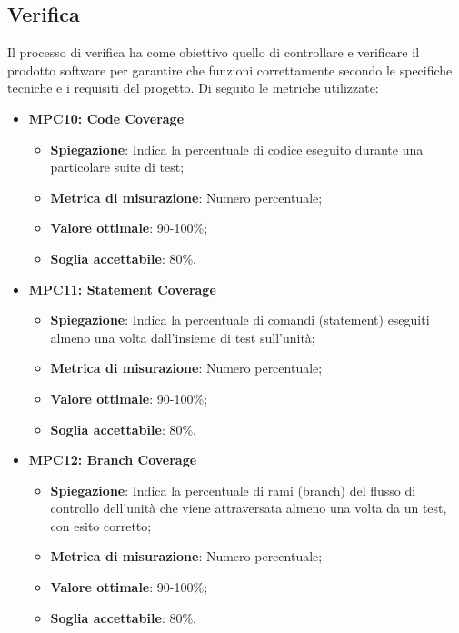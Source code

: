 \subsection{Verifica}
Il processo di verifica ha come obiettivo quello di controllare e verificare il prodotto software per garantire che funzioni correttamente secondo le specifiche tecniche e i requisiti del progetto. Di seguito le metriche utilizzate:

\begin{itemize}
    \item \textbf{MPC10: Code Coverage}
    \begin{itemize}
        \item \textbf{Spiegazione}: Indica la percentuale di codice eseguito durante una particolare suite di test;
        \item \textbf{Metrica di misurazione}: Numero percentuale;
        \item \textbf{Valore ottimale}: 90-100\%;
        \item \textbf{Soglia accettabile}: 80\%.
    \end{itemize}

    \item \textbf{MPC11: Statement Coverage}
    \begin{itemize}
        \item \textbf{Spiegazione}: Indica la percentuale di comandi (statement) eseguiti almeno una volta dall'insieme di test sull'unità;
        \item \textbf{Metrica di misurazione}: Numero percentuale;
        \item \textbf{Valore ottimale}: 90-100\%;
        \item \textbf{Soglia accettabile}: 80\%.
    \end{itemize}

    \item \textbf{MPC12: Branch Coverage}
    \begin{itemize}
        \item \textbf{Spiegazione}: Indica la percentuale di rami (branch) del flusso di controllo dell'unità che viene attraversata almeno una volta da un test, con esito corretto;
        \item \textbf{Metrica di misurazione}: Numero percentuale;
        \item \textbf{Valore ottimale}: 90-100\%;
        \item \textbf{Soglia accettabile}: 80\%.
    \end{itemize}


\end{itemize}

